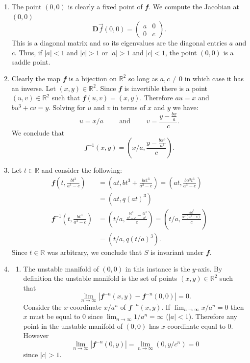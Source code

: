 \documentclass[
  a4paper,
  oneside,
  final]{krantz}
\newcommand{\R}{\mathbb{R}}
\renewcommand{\v}[1]{{\mathbfit{#1}}}
\newcommand{\jacob}{{\mathbf{D}}\vec{f}}
\theoremstyle{definition}
\theoremstyle{definition}
\theoremstyle{definition}
\theoremstyle{definition}
\theoremstyle{remark}
\begin{document}
\begin{enumerate}
\def\labelenumi{\alph{enumi}.}
\item
  The point \((0,0)\) is clearly a fixed point of \(\v{f}\). We compute the Jacobian at \((0,0)\)
  \[
  \jacob(0,0) = \begin{pmatrix}
               a & 0 \\
               0 & c
             \end{pmatrix}.
  \]
  This is a diagonal matrix and so its eigenvalues are the diagonal entries \(a\) and \(c\). Thus, if \(|a|<1\) and \(|c|>1\) or \(|a|>1\) and \(|c|<1\), the point \((0,0)\) is a saddle point.
\item
  Clearly the map \(\v{f}\) is a bijection on \(\R^2\) so long as \(a,c \ne 0\) in which case it has an inverse. Let \((x,y) \in \R^2\). Since \(\v{f}\) is invertible there is a point \((u,v) \in \R^2\) such that \(\v{f}(u,v) = (x,y)\). Therefore \(au = x\) and \(bu^3 + cv = y\). Solving for \(u\) and \(v\) in terms of \(x\) and \(y\) we have:
  \[u = x/a \qquad \text{ and } \qquad  v = \frac{y- \frac{bx}{a} }{c}.\]
  We conclude that
  \[\v{f}^{-1}(x,y) = \left(x/a, \frac{y- \frac{bx^3}{a^3} }{c}\right).\]
\item
  Let \(t\in \R\) and consider the following:
  \begin{align*}
  \v{f}\left(t, \frac{bt^3}{a^3 -c}\right) &= \left(at, bt^3 + \frac{bct^3}{a^3 -c}\right) = \left(at, \frac{ba^3t^3}{a^3 -c}\right) \\ &= (at, q(at)^3) \\
  \v{f}^{-1}\left(t, \frac{bt^3}{a^3 -c}\right) & = \left(t/a, \frac{\frac{bt^3}{a^3 -c} - \frac{bt^3}{a^3}}{c}\right) = \left(t/a,\frac{\frac{cbt^3}{a^3(a^3 -c)}}{c}\right) \\ &= \left(t/a, q (t/a)^3\right).
  \end{align*}
  Since \(t \in \R\) was arbitrary, we conclude that \(S\) is invariant under \(\v{f}\).
\item
  \begin{enumerate}
  \def\labelenumii{\roman{enumii}.}
  \item
    The unstable manifold of \((0,0)\) in this instance is the \(y\)-axis. By definition the unstable manifold is the set of points \((x,y) \in \R^2\) such that
    \[\lim_{n \to \infty} |\v{f}^{-n}(x,y) - \v{f}^{-n}(0,0)| = 0.\]
    Consider the \(x\)-coordinate \(x/a^{n}\) of \(\v{f}^{-n}(x,y)\). If \(\lim_{n \to \infty} x/a^{n} = 0\) then \(x\) must be equal to \(0\) since \(\lim_{n \to \infty}1/a^{n} = \infty\) (\(|a|<1\)). Therefore any point in the unstable manifold of \((0,0)\) has \(x\)-coordinate equal to \(0\). However
    \[\lim_{n \to \infty} |\v{f}^{-n}(0,y)| = \lim_{n \to \infty} (0,y/c^{n}) = 0 \]
    since \(|c|>1\).


\end{enumerate}
\end{enumerate}
\end{document}
